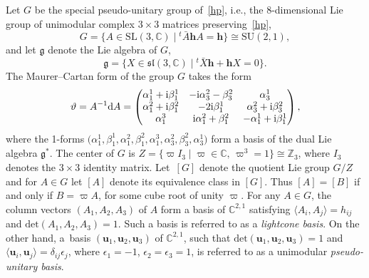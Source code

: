 \documentclass[pdftex]{sigma}
\numberwithin{equation}{section}
\def\C{\mathbb{C}}
\begin{document}
Let $G$ be the special pseudo-unitary group of~\eqref{hp},
i.e., the 8-dimensional Lie group
of unimodular complex $3 \times 3$ matrices
preserving~\eqref{hp},
\begin{equation*}%
G = \big\{ A \in \mathrm{SL}(3,\mathbb C) \mid {^t\!\bar{A}}\mathbf h A = \mathbf h\big\} \cong \mathrm{SU}(2,1),
\end{equation*}
%
and let $\mathfrak g$ denote the Lie algebra of $G$,
\begin{equation*}%
\mathfrak g = \big\{ X \in \mathfrak{sl}(3,\mathbb C) \mid {^t\!\bar{X}}\mathbf h + \mathbf h X = 0\big\}.
\end{equation*}
%
The Maurer--Cartan form of the group $G$ takes the form
\begin{equation*}
\vartheta = A^{-1}{\rm d}A =\begin{pmatrix}
\alpha_1^1 +{\rm i} \beta_1^1 & -{\rm i} \alpha_3^2 - \beta_3^2 & \alpha_3^1\\
\alpha_1^2 +{\rm i} \beta_1^2 &-2{\rm i} \beta_1^1 & \alpha_3^2 +{\rm i}\beta_3^2 \\
 \alpha_1^3 &{\rm i} \alpha_1^2 + \beta_1^2& -\alpha_1^1 +{\rm i} \beta_1^1\\
\end{pmatrix},
\end{equation*}
where the 1-forms
$
 \big(\alpha_1^1 , \beta_1^1 , \alpha_1^2 , \beta_1^2 ,\alpha_1^3 , \alpha_3^2 , \beta_3^2 , \alpha_3^1\big)
 $
form a basis of the dual Lie algebra ${\mathfrak g}^*$.
%
The center of $G$ is $Z = \big\{\varpi I_3\mid \varpi \in \mathbb C, \,\varpi^3 =1\big\}\cong \mathbb Z_3$, where
$I_3$ denotes the $3\times 3$ identity matrix. Let~$[G]$ denote the quotient Lie
group $G/Z$ and for $A\in G$ let $[A]$ denote its equivalence class in $[G]$.
Thus $[A] = [B]$ if and only if $B = \varpi A$, for some cube root
of unity $\varpi$.
%
For any $A\in G$, the column vectors $(A_1, A_2, A_3)$ of $A$ form a basis of $\C^{2,1}$
satisfying $\langle A_i, A_j \rangle = h_{ij}$ and $\mathrm{det}(A_1, A_2, A_3) =1$. Such a basis is
referred to as a
{\em lightcone basis}.
%
On the other hand, a~basis $(\mathbf{u}_1, \mathbf{u}_2, \mathbf{u}_3)$ of $\C^{2,1}$,
such that $\mathrm{det}(\mathbf{u}_1, \mathbf{u}_2, \mathbf{u}_3) =1$ and
$\langle \mathbf{u}_i, \mathbf{u}_j \rangle = \delta_{ij}\epsilon_j$, where
$\epsilon_1 = -1$, $\epsilon_2 = \epsilon_3 = 1$,
is referred to as a unimodular {\em pseudo-unitary basis}.
\end{document}
